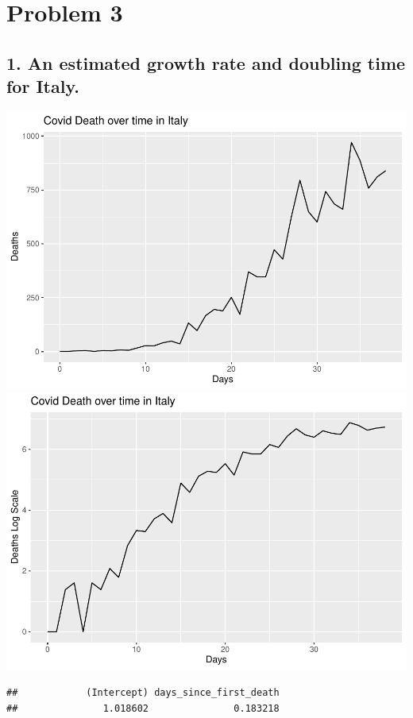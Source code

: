\documentclass[
]{article}
\begin{document}
\hypertarget{problem-3}{%
\section{Problem 3}\label{problem-3}}

\hypertarget{an-estimated-growth-rate-and-doubling-time-for-italy.}{%
\subsection{1. An estimated growth rate and doubling time for
Italy.}\label{an-estimated-growth-rate-and-doubling-time-for-italy.}}

\includegraphics{HW3_files/figure-latex/unnamed-chunk-6-1.pdf}
\includegraphics{HW3_files/figure-latex/unnamed-chunk-6-2.pdf}

\begin{verbatim}
##            (Intercept) days_since_first_death 
##               1.018602               0.183218
\end{verbatim}
\end{document}
